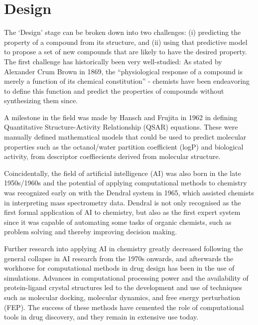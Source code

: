 \section*{Design}

The `Design' stage can be broken down into two challenges: (i) predicting the property of a compound from its structure, and (ii) using that predictive model to propose a set of new compounds that are likely to have the desired property. The first challenge has historically been very well-studied: As stated by Alexander Crum Brown in 1869, the ``physiological response of a compound is merely a function of its chemical constitution'' - chemists have been endeavoring to define this function and predict the properties of compounds without synthesizing them since.

A milestone in the field was made by Hansch and Frujita in 1962 in defining Quantitative Structure-Activity Relationship (QSAR) equations. These were manually defined mathematical models that could be used to predict molecular properties such as the octanol/water partition coefficient (logP) and biological activity, from descriptor coeffiecients derived from molecular structure.

Coincidentally, the field of artificial intelligence (AI) was also born in the late 1950s/1960s and the potential of applying computational methods to chemistry was recognized early on with the Dendral system in 1965, which assisted chemists in interpreting mass spectrometry data. Dendral is not only recognised as the first formal application of AI to chemistry, but also as the first expert system since it was capable of automating some tasks of organic chemists, such as problem solving and thereby improving decision making.

Further research into applying AI in chemistry greatly decreased following the general collapse in AI research from the 1970s onwards, and afterwards the workhorse for computational methods in drug design has been in the use of simulations. Advances in computational processing power and the availability of protein-ligand crystal structures led to the development and use of techniques such as molecular docking, molecular dynamics, and free energy perturbation (FEP). The success of these methods have cemented the role of computational tools in drug discovery, and they remain in extensive use today.


